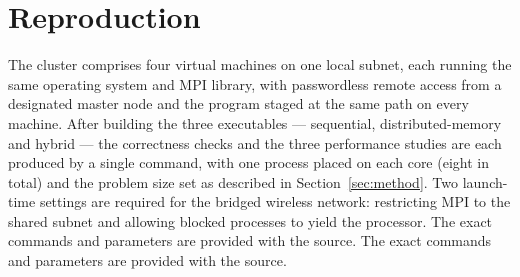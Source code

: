 \documentclass[11pt,a4paper]{article}
\begin{document}
\appendix
\section{Reproduction}
\label{app:repro}

The cluster comprises four virtual machines on one local subnet, each running the
same operating system and MPI library, with passwordless remote access from a
designated master node and the program staged at the same path on every machine.
After building the three executables --- sequential, distributed-memory and
hybrid --- the correctness checks and the three performance studies are each
produced by a single command, with one process placed on each core (eight in total)
and the problem size set as described in Section~\ref{sec:method}. Two launch-time
settings are required for the bridged wireless network: restricting MPI to the
shared subnet and allowing blocked processes to yield the processor. The exact
commands and parameters are provided with the source.
The exact commands and parameters are provided with the source.
\end{document}
